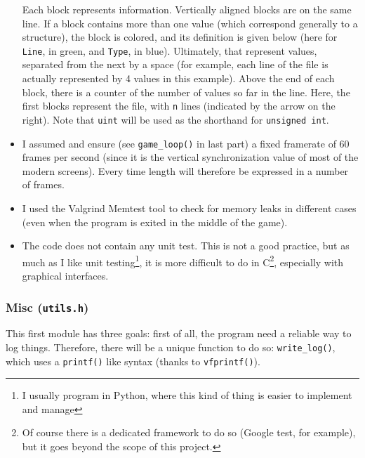 \documentclass[12pt,a4paper]{article}
\newcommand{\cc}[1]{\texttt{#1}}
\begin{document}
\begin{itemize}
\begin{center}
\end{center}
Each block represents information. Vertically aligned blocks are on the same line. If a block contains more than one value (which correspond generally to a structure), the block is colored, and its definition is given below (here for \texttt{Line}, in green, and \texttt{Type}, in blue). Ultimately, that represent values, separated from the next by a space (for example, each line of the file is actually represented by 4 values in this example). Above the end of each block, there is a counter of the number of values so far in the line.
Here, the first blocks represent the file, with \texttt{n} lines (indicated by the arrow on the right). Note that \texttt{uint} will be used as the shorthand for \cc{unsigned int}.
\item I assumed and ensure (see \cc{game_loop()} in last part) a fixed framerate of 60 frames per second (since it is the vertical synchronization value of most of the modern screens). Every time length will therefore be expressed in a number of frames. 
\item I used the Valgrind Memtest tool \cite{valgrind} to check for memory leaks in different cases (even when the program is exited in the middle of the game).
\item The code does not contain any unit test. This is not a good practice, but as much as I like unit testing\footnote{I usually program in Python, where this kind of thing is easier to implement and manage}, it is more difficult to do in C\footnote{Of course there is a dedicated framework to do so (Google test, for example), but it goes beyond the scope of this project.}, especially with graphical interfaces.
\end{itemize}

\subsubsection{Misc (\texttt{utils.h})}

This first module has three goals: first of all, the program need a reliable way to log things. Therefore, there will be a unique function to do so: \cc{write_log()}, which uses a \cc{printf()} like syntax (thanks to \cc{vfprintf()}).
\end{document}
